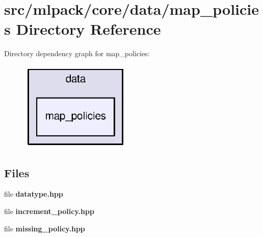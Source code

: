 \section{src/mlpack/core/data/map\+\_\+policies Directory Reference}
\label{dir_6b9fa97388050abaff55d13799cc7bdd}
Directory dependency graph for map\+\_\+policies\+:
\nopagebreak
\begin{figure}[H]
\begin{center}
\leavevmode
\includegraphics[width=150pt]{dir_6b9fa97388050abaff55d13799cc7bdd_dep}
\end{center}
\end{figure}
\subsection*{Files}
\begin{DoxyCompactItemize}
\item 
file {\bf datatype.\+hpp}
\item 
file {\bf increment\+\_\+policy.\+hpp}
\item 
file {\bf missing\+\_\+policy.\+hpp}
\end{DoxyCompactItemize}
